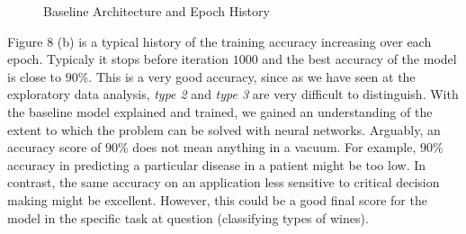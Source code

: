 \documentclass[11pt,twoside]{article}
\numberwithin{Theorem}{section}
\numberwithin{Definition}{section}
\numberwithin{Lemma}{section}
\numberwithin{Algorithm}{section}
\numberwithin{equation}{section}
\begin{document}
\begin{figure}
{{}
}%
\caption{Baseline Architecture and Epoch History}
\label{fig:base}
\end{figure}
Figure 8 (b) is a typical history of the training accuracy increasing over each epoch. Typicaly it stops before iteration $1000$ and the best accuracy of the model is close to $90\%$. This is a very good accuracy, since as we have seen at the exploratory data analysis, \textit{type 2} and \textit{type 3} are very difficult to distinguish.
With the baseline model explained and trained, we gained an understanding of the extent to which the problem can be solved with neural networks. Arguably, an accuracy score of $90\%$ does not mean anything in a vacuum. For example, $90\%$ accuracy in predicting a particular disease in a patient might be too low. In contrast, the same accuracy on an application less sensitive to critical decision making might be excellent. However, this could be a good final score for the model in the specific task at question (classifying types of wines).
\end{document}
